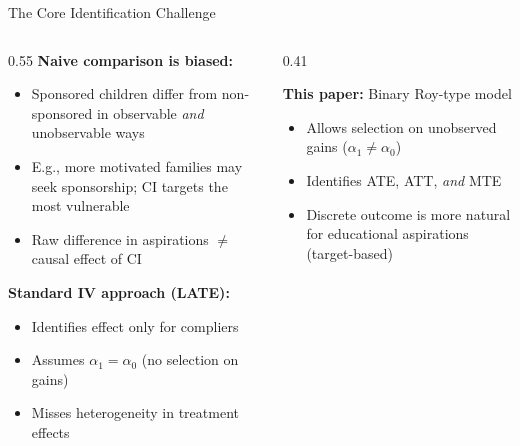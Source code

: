 \documentclass[aspectratio=169, 10pt]{beamer}
\begin{document}
\begin{frame}{The Core Identification Challenge}
  \begin{columns}
    \begin{column}{0.55\textwidth}
      \textbf{Naive comparison is biased:}
      \begin{itemize}
        \item Sponsored children differ from non-sponsored in observable \textit{and} unobservable ways
        \item E.g., more motivated families may seek sponsorship; CI targets the most vulnerable
        \item Raw difference in aspirations $\neq$ causal effect of CI
      \end{itemize}
      \vspace{0.5em}
      \textbf{Standard IV approach (LATE):}
      \begin{itemize}
        \item Identifies effect only for compliers
        \item Assumes $\alpha_1 = \alpha_0$ (no selection on gains)
        \item Misses heterogeneity in treatment effects
      \end{itemize}
    \end{column}
    \begin{column}{0.41\textwidth}
      \begin{methodbox}
        \textbf{This paper:} Binary Roy-type model \citep{Aakvik2005}
        \begin{itemize}
          \item Allows selection on unobserved gains ($\alpha_1 \neq \alpha_0$)
          \item Identifies ATE, ATT, \textit{and} MTE
          \item Discrete outcome is more natural for educational aspirations (target-based)
        \end{itemize}
      \end{methodbox}
    \end{column}
  \end{columns}
\end{frame}
\end{document}

